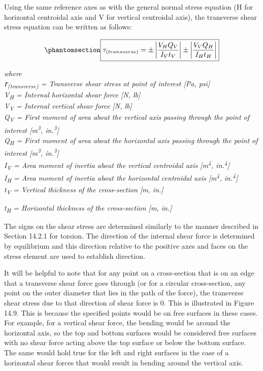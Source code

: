 \documentclass[
  letterpaper,
  DIV=11,
  numbers=noendperiod]{scrreprt}
\theoremstyle{definition}
\theoremstyle{remark}
\begin{document}
Using the same reference axes as with the general normal stress equation
(H for horizontal centroidal axis and V for vertical centroidal axis),
the transverse shear stress equation can be written as follows:

\begin{equation}\phantomsection\label{eq-14.3}{
\boxed{\tau_{(transverse)}= \pm\left|\frac{V_H Q_V}{I_V t_V}\right| \pm\left|\frac{V_V Q_H}{I_H t_H}\right|}
}\end{equation}

\emph{where}\\
\emph{𝜏\textsubscript{(transverse)} = Transverse shear stress at point
of interest {[}Pa, psi{]}}\\
\emph{V\textsubscript{H} = Internal horizontal shear force {[}N,
lb{]}}\\
\emph{V\textsubscript{V} = Internal vertical shear force {[}N, lb{]}}\\
\emph{Q\textsubscript{V} = First moment of area about the vertical axis
passing through the point of interest {[}m\textsuperscript{3},
in.\textsuperscript{3}{]}}\\
\emph{Q\textsubscript{H} = First moment of area about the horizontal
axis passing through the point of interest {[}m\textsuperscript{3},
in.\textsuperscript{3}{]}}\\
\emph{I\textsubscript{V} = Area moment of inertia about the vertical
centroidal axis {[}m\textsuperscript{4}, in.\textsuperscript{4}{]}}\\
\emph{I\textsubscript{H} = Area moment of inertia about the horizontal
centroidal axis {[}m\textsuperscript{4}, in.\textsuperscript{4}{]}}\\
\emph{t\textsubscript{V} = Vertical thickness of the cross-section {[}m,
in.{]}}

\emph{t\textsubscript{H} = Horizontal thickness of the cross-section
{[}m, in.{]}}

The signs on the shear stress are determined similarly to the manner
described in Section 14.2.1 for torsion. The direction of the internal
shear force is determined by equilibrium and this direction relative to
the positive axes and faces on the stress element are used to establish
direction.

It will be helpful to note that for any point on a cross-section that is
on an edge that a transverse shear force goes through (or for a circular
cross-section, any point on the outer diameter that lies in the path of
the force), the transverse shear stress due to that direction of shear
force is 0. This is illustrated in Figure 14.9. This is because the
specified points would be on free surfaces in these cases. For example,
for a vertical shear force, the bending would be around the horizontal
axis, so the top and bottom surfaces would be considered free surfaces
with no shear force acting above the top surface or below the bottom
surface. The same would hold true for the left and right surfaces in the
case of a horizontal shear forces that would result in bending around
the vertical axis.
\end{document}
